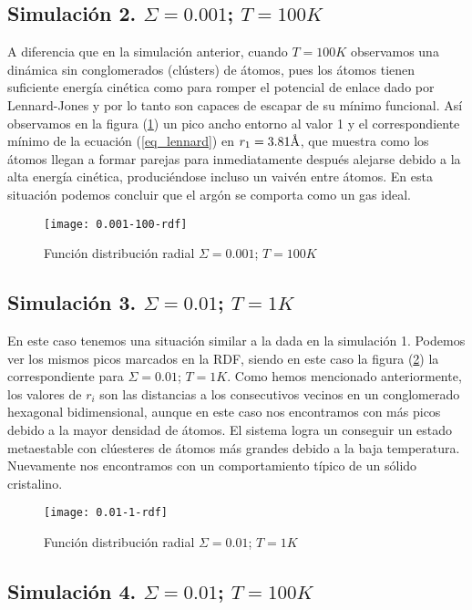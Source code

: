 \subsection{Simulación 2. $\Sigma=0.001$; $T=100K$}

A diferencia que en la simulación anterior, cuando $T=100K$ observamos una dinámica sin conglomerados (clústers) de átomos, pues los átomos tienen suficiente energía cinética como para romper el potencial de enlace dado por Lennard-Jones y por lo tanto son capaces de escapar de su mínimo funcional. Así observamos en la figura (\ref{rdf_0.001_100}) un pico ancho entorno al valor 1 y el correspondiente mínimo de la ecuación (\ref{eq_lennard}) en $r_{1} = 3.81 \textup{\r{A}}$, que muestra como los átomos llegan a formar parejas para inmediatamente después alejarse debido a la alta energía cinética, produciéndose incluso un vaivén entre átomos. En esta situación podemos concluir que el argón se comporta como un gas ideal.

\begin{figure}[t]
	\texttt{[image: 0.001-100-rdf]}
	\caption{Función distribución radial $\Sigma=0.001$; $T=100K$}
	\label{rdf_0.001_100}
\end{figure}

\subsection{Simulación 3. $\Sigma=0.01$; $T=1K$}

En este caso tenemos una situación similar a la dada en la simulación 1. Podemos ver los mismos picos marcados en la RDF, siendo en este caso la figura (\ref{rdf_0.01-1}) la correspondiente para $\Sigma=0.01$; $T=1K$. Como hemos mencionado anteriormente, los valores de $r_i$ son las distancias a los consecutivos vecinos en un conglomerado hexagonal bidimensional, aunque en este caso nos encontramos con más picos debido a la mayor densidad de átomos. El sistema logra un conseguir un estado metaestable con clúesteres de átomos más grandes debido a la baja temperatura. Nuevamente nos encontramos con un comportamiento típico de un sólido cristalino.

\begin{figure}[t]
	\texttt{[image: 0.01-1-rdf]}
	\caption{Función distribución radial $\Sigma=0.01$; $T=1K$}
	\label{rdf_0.01-1}
\end{figure}

\subsection{Simulación 4. $\Sigma=0.01$; $T=100K$}

